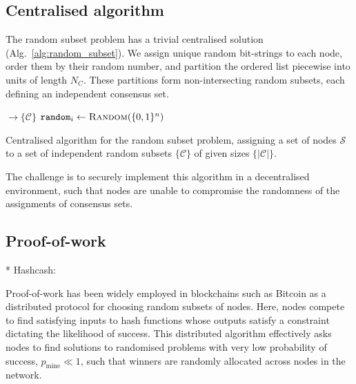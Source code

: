\subsection{Centralised algorithm}

The random subset problem has a trivial centralised solution (Alg.~\ref{alg:random_subset}). We assign unique random bit-strings to each node, order them by their random number, and partition the ordered list piecewise into units of length $N_C$. These partitions form non-intersecting random subsets, each defining an independent consensus set.

\begin{algorithm}[H]
	\begin{algorithmic}
		 $\to \{\mathcal{C}\}$
		\State $\mathtt{random}_i \gets \textsc{Random}(\{0,1\}^n)$	\EndFor
		\State {}
		\EndFunction
	\end{algorithmic}
	\caption{Centralised algorithm for the random subset problem, assigning a set of nodes $\mathcal{S}$ to a set of independent random subsets $\{\mathcal{C}\}$ of given sizes $\{|\mathcal{C}|\}$.} \label{alg:random_subset}
\end{algorithm}

The challenge is to securely implement this algorithm in a decentralised environment, such that nodes are unable to compromise the randomness of the assignments of consensus sets.

\subsection{Proof-of-work} \label{sec:PoW}

* Hashcash: \cite{powemail, hashcash}

Proof-of-work has been widely employed in blockchains such as Bitcoin \cite{Nakamoto08} as a distributed protocol for choosing random subsets of nodes. Here, nodes compete to find satisfying inputs to hash functions whose outputs satisfy a constraint dictating the likelihood of success. This distributed algorithm effectively asks nodes to find solutions to randomised problems with very low probability of success, $p_\mathrm{mine}\ll 1$, such that winners are randomly allocated across nodes in the network.

